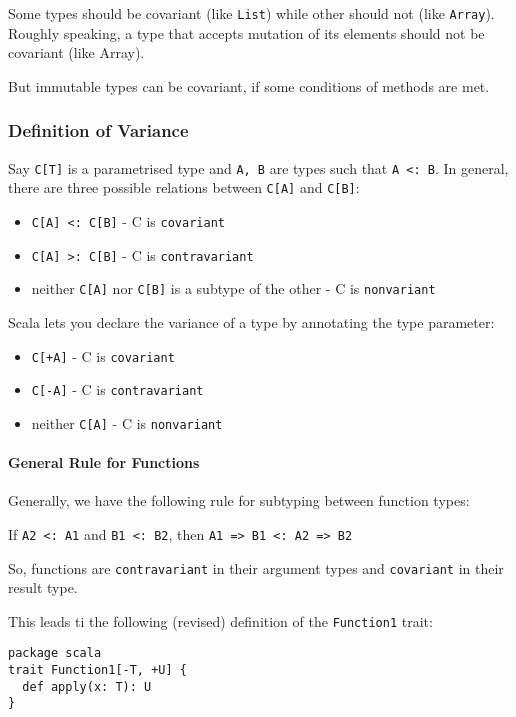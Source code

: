 \documentclass{scrartcl}
\newcommand{\term}[1]{\verb~#1~} %
\begin{document}
Some types should be covariant (like \lstinline|List|) while other should not
(like \lstinline|Array|). Roughly speaking, a type that accepts mutation of its
elements should not be covariant (like Array).

But immutable types can be covariant, if some conditions of methods are met.

\subsubsection{Definition of Variance}

Say \lstinline|C[T]| is a parametrised type and \lstinline|A, B| are types such
that \lstinline|A <: B|. In general, there are three possible relations between
\lstinline|C[A]| and \lstinline|C[B]|:
\begin{itemize}
\item \lstinline|C[A] <: C[B]| - C is \term{covariant}
\item \lstinline|C[A] >: C[B]| - C is \term{contravariant}
\item neither \lstinline|C[A]| nor \lstinline|C[B]| is a subtype of the other -
  C is \term{nonvariant}
\end{itemize}

Scala lets you declare the variance of a type by annotating the type parameter:
\begin{itemize}
\item \lstinline|C[+A]| - C is \term{covariant}
\item \lstinline|C[-A]| - C is \term{contravariant}
\item neither \lstinline|C[A]| - C is \term{nonvariant}
\end{itemize}

\paragraph{General Rule for Functions}

Generally, we have the following rule for subtyping between function types:

If \lstinline|A2 <: A1| and \lstinline|B1 <: B2|, then
\lstinline|A1 => B1 <: A2 => B2|

So, functions are \term{contravariant} in their argument types and
\term{covariant} in their result type.

This leads ti the following (revised) definition of the \lstinline|Function1|
trait: 
\begin{lstlisting}
package scala
trait Function1[-T, +U] {
  def apply(x: T): U
}
\end{lstlisting}
\end{document}
